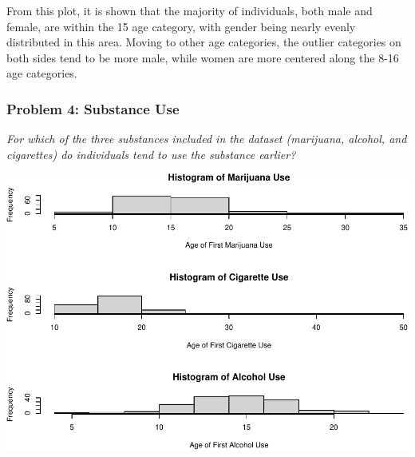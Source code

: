 \documentclass[
]{article}
\newenvironment{Shaded}{\begin{snugshade}}{\end{snugshade}}
\newcommand{\AttributeTok}[1]{\textcolor[rgb]{0.77,0.63,0.00}{#1}}
\newcommand{\DecValTok}[1]{\textcolor[rgb]{0.00,0.00,0.81}{#1}}
\newcommand{\FunctionTok}[1]{\textcolor[rgb]{0.00,0.00,0.00}{#1}}
\newcommand{\NormalTok}[1]{#1}
\newcommand{\SpecialCharTok}[1]{\textcolor[rgb]{0.00,0.00,0.00}{#1}}
\newcommand{\StringTok}[1]{\textcolor[rgb]{0.31,0.60,0.02}{#1}}
\begin{document}
From this plot, it is shown that the majority of individuals, both male
and female, are within the 15 age category, with gender being nearly
evenly distributed in this area. Moving to other age categories, the
outlier categories on both sides tend to be more male, while women are
more centered along the 8-16 age categories.

\hypertarget{problem-4-substance-use}{%
\subsubsection{Problem 4: Substance Use}\label{problem-4-substance-use}}

\emph{For which of the three substances included in the dataset
(marijuana, alcohol, and cigarettes) do individuals tend to use the
substance earlier?}

\begin{Shaded}
\end{Shaded}

\includegraphics{Journal_files/figure-latex/unnamed-chunk-16-1.pdf}
\end{document}
